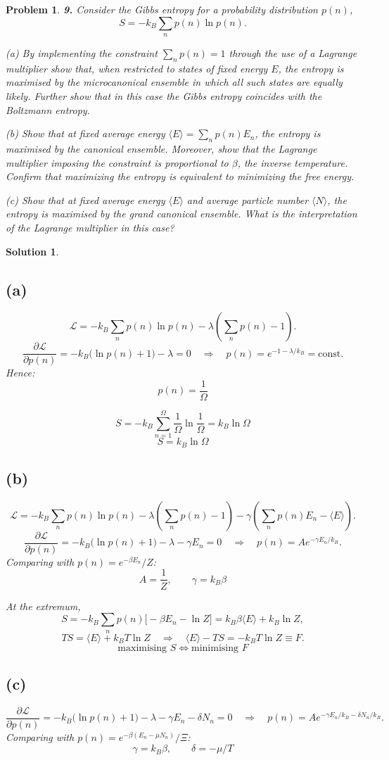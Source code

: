 \documentclass[11pt]{article}
\newtheorem*{problem}{Problem}
\newtheorem*{solution}{Solution}
\begin{document}
\begin{problem}
\textbf{9.} Consider the Gibbs entropy for a probability distribution $p(n)$,
\[
S=-k_B\sum_n p(n)\ln p(n).
\]

(a) By implementing the constraint $\sum_np(n)=1$ through the use of a Lagrange multiplier show
that, when restricted to states of fixed energy $E$, the entropy is maximised by the
microcanonical ensemble in which all such states are equally likely. Further show that in this
case the Gibbs entropy coincides with the Boltzmann entropy.

(b) Show that at fixed \textit{average} energy $\langle E\rangle=\sum_np(n)E_n$, the entropy is
maximised by the canonical ensemble. Moreover, show that the Lagrange multiplier imposing the
constraint is proportional to $\beta$, the inverse temperature. Confirm that maximizing the
entropy is equivalent to minimizing the free energy.

(c) Show that at fixed average energy $\langle E\rangle$ and average particle number
$\langle N\rangle$, the entropy is maximised by the grand canonical ensemble. What is the
interpretation of the Lagrange multiplier in this case?
\end{problem}

\begin{solution}
\subsection*{(a)}
\[
\mathcal{L}=-k_B\sum_np(n)\ln p(n)-\lambda\left(\sum_np(n)-1\right).
\]
\[
\frac{\partial\mathcal{L}}{\partial p(n)}=-k_B\big(\ln p(n)+1\big)-\lambda=0
\quad\Rightarrow\quad
p(n)=e^{-1-\lambda/k_B}=\text{const}.
\]
Hence:
\[
\boxed{p(n)=\frac1\Omega}
\]

\[
S=-k_B\sum_{n=1}^\Omega\frac1\Omega\ln\frac1\Omega=k_B\ln\Omega
\]
\[
\boxed{S=k_B\ln\Omega}
\]

\subsection*{(b)}
\[
\mathcal{L}=-k_B\sum_np(n)\ln p(n)-\lambda\left(\sum_np(n)-1\right)-\gamma\left(\sum_np(n)E_n-\langle E\rangle\right).
\]
\[
\frac{\partial\mathcal{L}}{\partial p(n)}=-k_B\big(\ln p(n)+1\big)-\lambda-\gamma E_n=0
\quad\Rightarrow\quad
p(n)=Ae^{-\gamma E_n/k_B}.
\]
Comparing with $p(n)=e^{-\beta E_n}/Z$:
\[
\boxed{A=\frac1Z,\qquad \gamma=k_B\beta}
\]

At the extremum,
\[
S=-k_B\sum_np(n)\big[-\beta E_n-\ln Z\big]=k_B\beta\langle E\rangle+k_B\ln Z,
\]
\[
TS=\langle E\rangle+k_BT\ln Z
\quad\Rightarrow\quad
\langle E\rangle-TS=-k_BT\ln Z\equiv F.
\]
\[
\boxed{\text{maximising }S \iff \text{minimising }F}
\]

\subsection*{(c)}
\[
\frac{\partial\mathcal{L}}{\partial p(n)}=-k_B\big(\ln p(n)+1\big)-\lambda-\gamma E_n-\delta N_n=0
\quad\Rightarrow\quad
p(n)=Ae^{-\gamma E_n/k_B-\delta N_n/k_B}.
\]
Comparing with $p(n)=e^{-\beta(E_n-\mu N_n)}/\Xi$:
\[
\boxed{\gamma=k_B\beta,\qquad \delta=-\mu/T}
\]
\end{solution}
\end{document}
